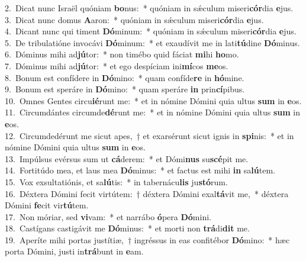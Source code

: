 {2.~}Dicat nunc Israël quóniam \textbf{bo}nus:~* quóniam in sǽculum miseri\textbf{cór}dia \textbf{e}jus.\\
{3.~}Dicat nunc domus \textbf{A}aron:~* quóniam in sǽculum miseri\textbf{cór}dia \textbf{e}jus.\\
{4.~}Dicant nunc qui timent \textbf{Dó}minum:~* quóniam in sǽculum miseri\textbf{cór}dia \textbf{e}jus.\\
{5.~}De tribulatióne invocávi \textbf{Dó}minum:~* et exaudívit me in lati\textbf{tú}dine \textbf{Dó}minus.\\
{6.~}Dóminus mihi ad\textbf{jú}tor:~* non timébo quid fáciat \textbf{mi}hi \textbf{ho}mo.\\
{7.~}Dóminus mihi ad\textbf{jú}tor:~* et ego despíciam ini\textbf{mí}cos \textbf{me}os.\\
{8.~}Bonum est confídere in \textbf{Dó}mino:~* quam confíde\textbf{re} in \textbf{hó}mine.\\
{9.~}Bonum est speráre in \textbf{Dó}mino:~* quam speráre \textbf{in} prin\textbf{cí}pibus.\\
{10.~}Omnes Gentes circu\textbf{ié}runt me:~* et in nómine Dómini quia ultus \textbf{sum} in \textbf{e}os.\\
{11.~}Circumdántes circumde\textbf{dé}runt me:~* et in nómine Dómini quia ultus \textbf{sum} in \textbf{e}os.\\
{12.~}Circumdedérunt me sicut apes,~† et exarsérunt sicut ignis in \textbf{spi}nis:~* et in nómine Dómini quia ultus \textbf{sum} in \textbf{e}os.\\
{13.~}Impúlsus evérsus sum ut \textbf{cá}derem:~* et Dómi\textbf{nus} su\textbf{scé}pit me.\\
{14.~}Fortitúdo mea, et laus mea \textbf{Dó}minus:~* et factus est mihi \textbf{in} sa\textbf{lú}tem.\\
{15.~}Vox exsultatiónis, et sa\textbf{lú}tis:~* in tabernácu\textbf{lis} ju\textbf{stó}rum.\\
{16.~}Déxtera Dómini fecit virtútem:~† déxtera Dómini exal\textbf{tá}vit me,~* déxtera Dómini \textbf{fe}cit vir\textbf{tú}tem.\\
{17.~}Non móriar, sed \textbf{vi}vam:~* et narrábo \textbf{ó}pera \textbf{Dó}mini.\\
{18.~}Castígans castigávit me \textbf{Dó}minus:~* et morti non \textbf{trá}di\textbf{dit} me.\\
{19.~}Aperíte mihi portas justítiæ,~† ingréssus in eas confitébor \textbf{Dó}mino:~* hæc porta Dómini, justi in\textbf{trá}bunt in \textbf{e}am.\\
